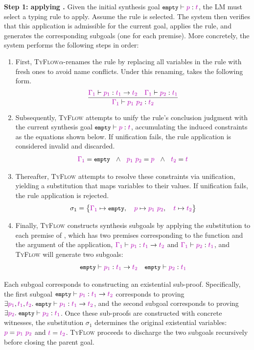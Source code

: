 \documentclass[manuscript,screen]{acmart}
\newcommand{\stlctype}[3]{{#1} \vdash {#2} : {#3}}
\newcommand{\sk}[1]{\textcolor{skunknown}{#1}}
\newcommand{\toolname}[1]{\textsc{#1}}
\newcommand{\tcode}[1]{{\small \texttt{\spaceskip=0.2em #1}}}
\newcommand{\mainname}{\toolname{TyFlow}\xspace}
\begin{document}
\smallskip \noindent \textbf{Step 1: applying .}
Given the initial synthesis goal $\stlctype{\tcode{empty}}{\sk{p}}{\sk{t}}$, the LM must select a typing rule to apply. Assume the rule  is selected. The system then verifies that this application is admissible for the current goal, applies the rule, and generates the corresponding subgoals (one for each premise). More concretely, the system performs the following steps in order:
\begin{enumerate}
    \item First, \mainname $\alpha$-renames the rule by replacing all variables in the rule with fresh ones to avoid name conflicts. Under this renaming,  takes the following form.
    $$\frac{\stlctype{\sk{\Gamma_1}}{\sk{p_1}}{\arr{\sk{t_1}}{\sk{t_2}}} \quad \stlctype{\sk{\Gamma_1}}{\sk{p_2}}{\sk{t_1}}}{\stlctype{\sk{\Gamma_1}}{\app{\sk{p_1}}{\sk{p_2}}}{\sk{t_2}}} $$

    \item Subsequently, \mainname attempts to unify the rule's conclusion judgment with the current synthesis goal $\stlctype{\tcode{empty}}{\sk{p}}{\sk{t}}$, accumulating the induced constraints as the equations shown below. If unification fails, the rule application is considered invalid and discarded.
    $$
    \sk{\Gamma_1} = \tcode{empty} \ \ \wedge\ \ \app{\sk{p_1}}{\sk{p_2}} = \sk{p}  \ \ \wedge \ \  \sk{t_2} = \sk{t}
    $$

    \item \label{action3}Thereafter, \mainname attempts to resolve these constraints via unification, yielding a substitution that maps variables to their values. If unification fails, the rule application is rejected.
    $$\sigma_1=\big\{ \sk{\Gamma_1} \mapsto \tcode{empty}, \quad \sk{p} \mapsto \app{\sk{p_1}}{\sk{p_2}}, \quad \sk{t} \mapsto \sk{t_2}\big\}$$

    \item Finally, \mainname constructs synthesis subgoals by applying the substitution to each premise of , which has two premises corresponding to the function and the argument of the application, 
    $\stlctype{\sk{\Gamma_1}}{\sk{p_1}}{\arr{\sk{t_1}}{\sk{t_2}}}$ and $\stlctype{\sk{\Gamma_1}}{\sk{p_2}}{\sk{t_1}}$, and \mainname will generate two subgoals:
    \begin{gather*}
    \stlctype{\tcode{empty}}{\sk{p_1}}{\arr{\sk{t_1}}{\sk{t_2}}} \quad \stlctype{\tcode{empty}}{\sk{p_2}}{\sk{t_1}}
    \end{gather*}
\end{enumerate}
Each subgoal corresponds to constructing an existential sub-proof. Specifically, the first subgoal $\stlctype{\tcode{empty}}{\sk{p_1}}{\arr{\sk{t_1}}{\sk{t_2}}}$ corresponds to proving $\exists \sk{p_1}, \sk{t_1}, \sk{t_2}.\; \stlctype{\tcode{empty}}{\sk{p_1}}{\arr{\sk{t_1}}{\sk{t_2}}}$, and the second subgoal corresponds to proving $\exists \sk{p_2}.\; \stlctype{\tcode{empty}}{\sk{p_2}}{\sk{t_1}}$. Once these sub-proofs are constructed with concrete witnesses, the substitution $\sigma_1$ determines the original existential variables: $\sk{p} = \app{\sk{p_1}}{\sk{p_2}}$ and $\sk{t} = \sk{t_2}$. \mainname proceeds to discharge the two subgoals recursively before closing the parent goal.
\end{document}
